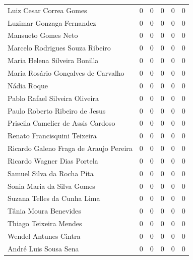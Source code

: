 \documentclass[12pt,brazil]{article}\usepackage[]{graphicx}\usepackage[]{xcolor}
\begin{document}
\begin{longtable}{lrrrrr}
Luiz Cesar Correa Gomes & 0 & 0 & 0 & 0 & 0 \\
Luzimar Gonzaga Fernandez & 0 & 0 & 0 & 0 & 0 \\
Mansueto Gomes Neto & 0 & 0 & 0 & 0 & 0 \\
Marcelo Rodrigues Souza Ribeiro & 0 & 0 & 0 & 0 & 0 \\
Maria Helena Silveira Bonilla & 0 & 0 & 0 & 0 & 0 \\
Maria Rosário Gonçalves de Carvalho & 0 & 0 & 0 & 0 & 0 \\
Nádia Roque & 0 & 0 & 0 & 0 & 0 \\
Pablo Rafael Silveira Oliveira & 0 & 0 & 0 & 0 & 0 \\
Paulo Roberto Ribeiro de Jesus & 0 & 0 & 0 & 0 & 0 \\
Priscila Camelier de Assis Cardoso & 0 & 0 & 0 & 0 & 0 \\
Renato Francisquini Teixeira & 0 & 0 & 0 & 0 & 0 \\
Ricardo Galeno Fraga de Araujo Pereira & 0 & 0 & 0 & 0 & 0 \\
Ricardo Wagner Dias Portela & 0 & 0 & 0 & 0 & 0 \\
Samuel Silva da Rocha Pita & 0 & 0 & 0 & 0 & 0 \\
Sonia Maria da Silva Gomes & 0 & 0 & 0 & 0 & 0 \\
Suzana Telles da Cunha Lima & 0 & 0 & 0 & 0 & 0 \\
Tânia Moura Benevides & 0 & 0 & 0 & 0 & 0 \\
Thiago Teixeira Mendes & 0 & 0 & 0 & 0 & 0 \\
\hline Wendel Antunes Cintra & 0 & 0 & 0 & 0 & 0 \\
André Luis Sousa Sena & 0 & 0 & 0 & 0 & 0 \\
\end{longtable}


\clearpage
\end{document}
